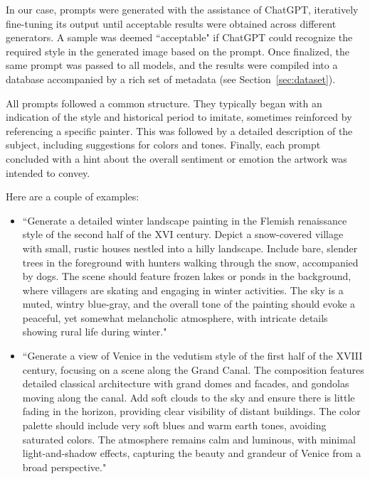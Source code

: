 \documentclass[sn-mathphys]{sn-jnl}
\begin{document}
In our case, prompts were generated with the assistance of ChatGPT, iteratively fine-tuning its output until acceptable results were obtained across different generators. A sample was deemed ``acceptable" if ChatGPT could recognize the required style in the generated image based on the prompt. 
Once finalized, the same prompt was passed to all models, and the results were compiled into a database accompanied by a rich set of metadata (see Section~\ref{sec:dataset}).

All prompts followed a common structure. They typically began with an indication of the style and historical period to imitate, sometimes reinforced by referencing a specific painter. This was followed by a detailed description of the subject, including suggestions for colors and tones. Finally, each prompt concluded with a hint about the overall sentiment or emotion the artwork was intended to convey. 

Here are a couple of examples:
\begin{itemize}
\item ``Generate a detailed winter landscape painting in the Flemish renaissance style of the second half of the XVI century. Depict a snow-covered village with small, rustic houses nestled into a hilly landscape. Include bare, slender trees in the foreground with hunters walking through the snow, accompanied by dogs. The scene should feature frozen lakes or ponds in the background, where villagers are skating and engaging in winter activities. The sky is a muted, wintry blue-gray, and the overall tone of the painting should evoke a peaceful, yet somewhat melancholic atmosphere, with intricate details showing rural life during winter."
\item ``Generate a view of Venice in the vedutism style of the first half of the XVIII century, focusing on a scene along the Grand Canal. The composition features detailed classical architecture with grand domes and facades, and gondolas moving along the canal. Add soft clouds to the sky and ensure there is little fading in the horizon, providing clear visibility of distant buildings. The color palette should include very soft blues and warm earth tones, avoiding saturated colors. The atmosphere remains calm and luminous, with minimal light-and-shadow effects, capturing the beauty and grandeur of Venice from a broad perspective."
\end{itemize}
\end{document}
